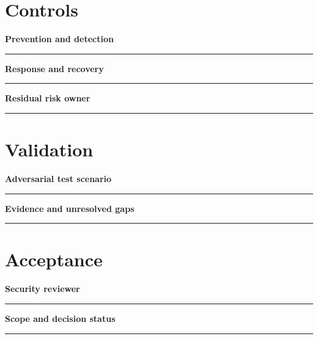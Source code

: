 \documentclass[11pt,letterpaper]{article}
\begin{document}
\section{Controls}
\noindent\textbf{Prevention and detection}\par
\vspace{1.1em}\noindent\rule{0.96\linewidth}{0.4pt}\par\vspace{0.65em}
\noindent\textbf{Response and recovery}\par
\vspace{1.1em}\noindent\rule{0.96\linewidth}{0.4pt}\par\vspace{0.65em}
\noindent\textbf{Residual risk owner}\par
\vspace{1.1em}\noindent\rule{0.96\linewidth}{0.4pt}\par\vspace{0.65em}
\section{Validation}
\noindent\textbf{Adversarial test scenario}\par
\vspace{1.1em}\noindent\rule{0.96\linewidth}{0.4pt}\par\vspace{0.65em}
\noindent\textbf{Evidence and unresolved gaps}\par
\vspace{1.1em}\noindent\rule{0.96\linewidth}{0.4pt}\par\vspace{0.65em}
\section{Acceptance}
\noindent\textbf{Security reviewer}\par
\vspace{1.1em}\noindent\rule{0.96\linewidth}{0.4pt}\par\vspace{0.65em}
\noindent\textbf{Scope and decision status}\par
\vspace{1.1em}\noindent\rule{0.96\linewidth}{0.4pt}\par\vspace{0.65em}
\end{document}
